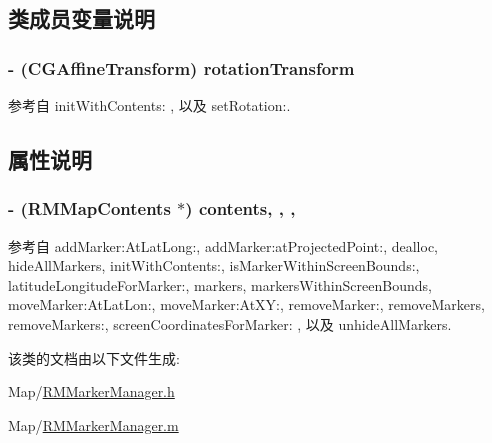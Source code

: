 \subsection{类成员变量说明}
\hypertarget{interface_r_m_marker_manager_a1ad3a07eaa130021e43cf400a497e6d3}{
\subsubsection[{rotation\-Transform}]{\setlength{\rightskip}{0pt plus 5cm}-\/ (C\-G\-Affine\-Transform) rotation\-Transform\hspace{0.3cm}{\ttfamily [protected]}}}\label{interface_r_m_marker_manager_a1ad3a07eaa130021e43cf400a497e6d3}


参考自 init\-With\-Contents\-: , 以及 set\-Rotation\-:.



\subsection{属性说明}
\hypertarget{interface_r_m_marker_manager_a5e24749c64023fbb7e2e3a161bb8f482}{
\subsubsection[{contents}]{\setlength{\rightskip}{0pt plus 5cm}-\/ ({\bf R\-M\-Map\-Contents} $\ast$) contents\hspace{0.3cm}{\ttfamily [read]}, {\ttfamily [write]}, {\ttfamily [atomic]}, {\ttfamily [assign]}}}\label{interface_r_m_marker_manager_a5e24749c64023fbb7e2e3a161bb8f482}


参考自 add\-Marker\-:\-At\-Lat\-Long\-:, add\-Marker\-:at\-Projected\-Point\-:, dealloc, hide\-All\-Markers, init\-With\-Contents\-:, is\-Marker\-Within\-Screen\-Bounds\-:, latitude\-Longitude\-For\-Marker\-:, markers, markers\-Within\-Screen\-Bounds, move\-Marker\-:\-At\-Lat\-Lon\-:, move\-Marker\-:\-At\-X\-Y\-:, remove\-Marker\-:, remove\-Markers, remove\-Markers\-:, screen\-Coordinates\-For\-Marker\-: , 以及 unhide\-All\-Markers.



该类的文档由以下文件生成\-:\begin{DoxyCompactItemize}
\item 
Map/\hyperlink{_r_m_marker_manager_8h}{R\-M\-Marker\-Manager.\-h}\item 
Map/\hyperlink{_r_m_marker_manager_8m}{R\-M\-Marker\-Manager.\-m}\end{DoxyCompactItemize}
